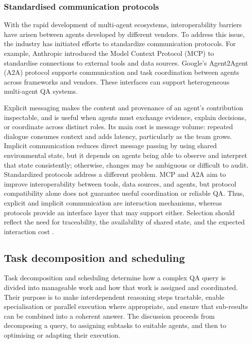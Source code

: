 \documentclass[a4paper,fleqn]{cas-dc}
\begin{document}
\subsubsection{Standardised communication protocols}
\label{sec:protocols}
With the rapid development of multi-agent ecosystems, interoperability barriers have arisen between agents developed by different vendors.
To address this issue, the industry has initiated efforts to standardize communication protocols. For example, Anthropic introduced the Model Context Protocol (MCP)
\citep{anthropic2024mcp} to standardise connections to external tools and data
sources. Google's Agent2Agent (A2A) protocol \citep{google2025a2a} supports
communication and task coordination between agents across frameworks and
vendors. These interfaces can support heterogeneous multi-agent QA systems.

Explicit messaging makes the content and
provenance of an agent's contribution inspectable, and is useful when agents
must exchange evidence, explain decisions, or coordinate across distinct
roles. Its main cost is message volume: repeated dialogue consumes context
and adds latency, particularly as the team grows. Implicit communication
reduces direct message passing by using shared environmental state, but it
depends on agents being able to observe and interpret that state consistently;
otherwise, changes may be ambiguous or difficult to audit. Standardized
protocols address a different problem. MCP and A2A aim to improve
interoperability between tools, data sources, and agents, but protocol
compatibility alone does not guarantee useful coordination or reliable QA.
Thus, explicit and implicit communication are interaction mechanisms,
whereas protocols provide an interface layer that may support either.
Selection should reflect the need for traceability, the availability of
shared state, and the expected interaction cost
\citep{wu2024autogen,qian2023chatdev,anthropic2024mcp,google2025a2a}.

\subsection{Task decomposition and scheduling}
\label{sec:task_decomp}

Task decomposition and scheduling determine how a complex QA query is divided
into manageable work and how that work is assigned and coordinated. Their
purpose is to make interdependent reasoning steps tractable, enable
specialisation or parallel execution where appropriate, and ensure that
sub-results can be combined into a coherent answer. The discussion proceeds
from decomposing a query, to assigning subtasks to suitable agents, and then
to optimising or adapting their execution.
\end{document}

